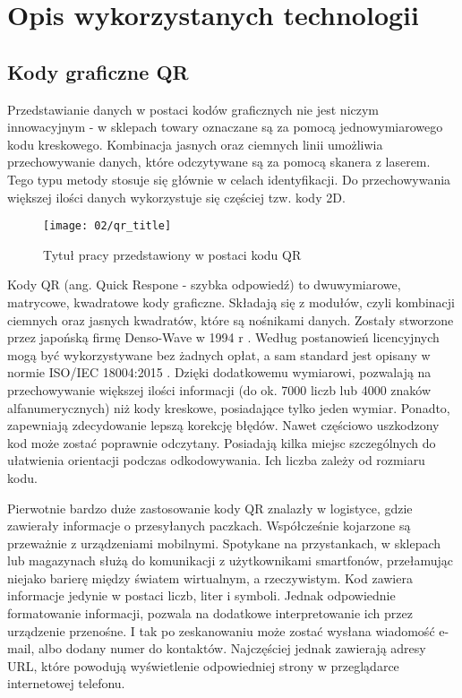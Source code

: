 \section{Opis wykorzystanych technologii}


\subsection{Kody graficzne QR}
Przedstawianie danych w postaci kodów graficznych nie jest niczym innowacyjnym - w sklepach towary oznaczane są za pomocą jednowymiarowego kodu kreskowego. Kombinacja jasnych oraz ciemnych linii umożliwia przechowywanie danych, które odczytywane są za pomocą skanera z laserem. Tego typu metody stosuje się głównie w celach identyfikacji. Do przechowywania większej ilości danych wykorzystuje się częściej tzw. kody 2D.
 
\begin{wrapfigure}[10]{r}{0.25\textwidth}
	\vspace{-15pt}
	\begin{center}
		\texttt{[image: 02/qr\_title]}
	\end{center}
	\vspace{-10pt}
	\caption{Tytuł pracy przedstawiony w postaci kodu QR}
	\vspace{-10pt}
\end{wrapfigure}

Kody QR (ang. Quick Respone - szybka odpowiedź) to dwuwymiarowe, matrycowe, kwadratowe kody graficzne. Składają się z modułów, czyli kombinacji ciemnych oraz jasnych kwadratów, które są nośnikami danych. Zostały stworzone przez japońską firmę Denso-Wave w 1994 r \cite{thonky_tutorial}. Według postanowień licencyjnych mogą być wykorzystywane bez żadnych opłat, a sam standard jest opisany w normie ISO/IEC 18004:2015 \cite{norma_qr}. Dzięki dodatkowemu wymiarowi, pozwalają na przechowywanie większej ilości informacji (do ok. 7000 liczb lub 4000 znaków alfanumerycznych) niż kody kreskowe, posiadające tylko jeden wymiar. Ponadto, zapewniają zdecydowanie lepszą korekcję błędów. Nawet częściowo uszkodzony kod może zostać poprawnie odczytany. Posiadają kilka miejsc szczególnych do ułatwienia orientacji podczas odkodowywania. Ich liczba zależy od rozmiaru kodu.

Pierwotnie bardzo duże zastosowanie kody QR znalazły w logistyce, gdzie zawierały informacje o przesyłanych paczkach. Współcześnie kojarzone są przeważnie z urządzeniami mobilnymi. Spotykane na przystankach, w sklepach lub magazynach służą do komunikacji z użytkownikami smartfonów, przełamując niejako barierę między światem wirtualnym, a rzeczywistym. Kod zawiera informacje jedynie w postaci liczb, liter i symboli. Jednak odpowiednie formatowanie informacji, pozwala na dodatkowe interpretowanie ich przez urządzenie przenośne. I tak po zeskanowaniu może zostać wysłana wiadomość e-mail, albo dodany numer do kontaktów. Najczęściej jednak zawierają adresy URL, które powodują wyświetlenie odpowiedniej strony w przeglądarce internetowej telefonu.

